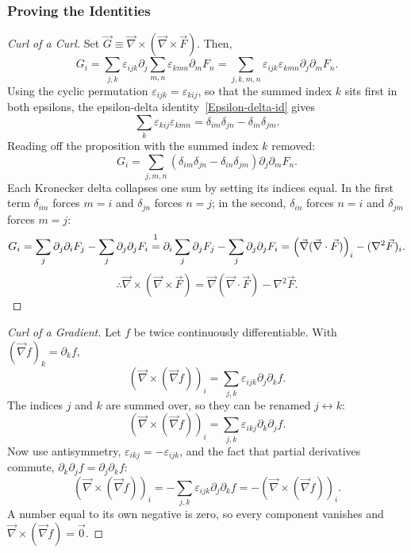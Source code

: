 \documentclass{article}
\begin{document}
\subsubsection{Proving the Identities}
\begin{proof}[Curl of a Curl]
    Set $\vec{G} \equiv \vec{\nabla}\times(\vec{\nabla}\times\vec{F})$. Then,
    \[G_i = \sum_{j,k}\varepsilon_{ijk}\partial_j\sum_{m,n} \varepsilon_{kmn}\partial_m F_n=\sum_{j,k,m,n}\varepsilon_{ijk}\varepsilon_{kmn}\partial_j\partial_mF_n.\]
    Using the cyclic permutation $\varepsilon_{ijk} = \varepsilon_{kij}$, so that the summed index $k$ sits first in both epsilons, the epsilon-delta identity~\ref{Epsilon-delta-id} gives
    \[\sum_k \varepsilon_{kij}\varepsilon_{kmn} = \delta_{im}\delta_{jn} - \delta_{in}\delta_{jm}.\]
    Reading off the proposition with the summed index $k$ removed:
    \[G_i = \sum_{j,m,n}\left(\delta_{im}\delta_{jn} - \delta_{in}\delta_{jm}\right)\partial_j\partial_m F_n.\]
    Each Kronecker delta collapses one sum by setting its indices equal. In the first term $\delta_{im}$ forces $m = i$ and $\delta_{jn}$ forces $n = j$; in the second, $\delta_{in}$ forces $n = i$ and $\delta_{jm}$ forces $m = j$:
    \[G_i = \sum_j \partial_j\partial_i F_j - \sum_j \partial_j\partial_j F_i \overset{\footnotemark}{=} \partial_i\sum_j\partial_j F_j - \sum_j \partial_j\partial_j F_i = \left(\vec{\nabla}(\vec{\nabla}\cdot\vec{F})\right)_i - (\nabla^2\vec{F})_i.\]
    \[\therefore \vec{\nabla}\times(\vec{\nabla}\times\vec{F}) = \vec{\nabla}(\vec{\nabla}\cdot\vec{F}) - \nabla^2\vec{F}.\]
\end{proof}
\begin{proof}[Curl of a Gradient]
    Let $f$ be twice continuously differentiable. With $(\vec{\nabla}f)_k = \partial_k f$,
    \[\left(\vec{\nabla}\times(\vec{\nabla}f)\right)_i = \sum_{j,k}\varepsilon_{ijk}\partial_j\partial_k f.\]
    The indices $j$ and $k$ are summed over, so they can be renamed $j \leftrightarrow k$:
    \[\left(\vec{\nabla}\times(\vec{\nabla}f)\right)_i = \sum_{j,k}\varepsilon_{ikj}\partial_k\partial_j f.\]
    Now use antisymmetry, $\varepsilon_{ikj} = -\varepsilon_{ijk}$, and the fact that partial derivatives commute, $\partial_k\partial_j f = \partial_j\partial_k f$:
    \[\left(\vec{\nabla}\times(\vec{\nabla}f)\right)_i = -\sum_{j,k}\varepsilon_{ijk}\partial_j\partial_k f = -\left(\vec{\nabla}\times(\vec{\nabla}f)\right)_i.\]
    A number equal to its own negative is zero, so every component vanishes and $\vec{\nabla}\times(\vec{\nabla}f) = \vec{0}$.
\end{proof}
\end{document}
